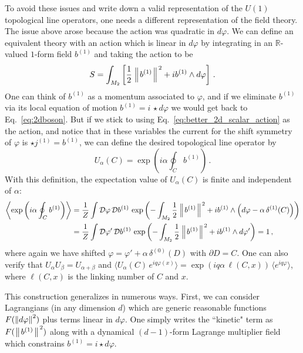 \documentclass[11pt]{article}
\newcommand{\formabs}[1]{\left\Arrowvert #1 \right\Arrowvert}
\begin{document}
To avoid these issues and write down a valid representation of the $U(1)$ topological line operators, one needs a different representation of the field theory.  The issue above arose because the action was quadratic in $d\varphi$.  We can define an equivalent theory with an action which is linear in $d\varphi$ by integrating in an $\mathbb{R}$-valued $1$-form field $b^{(1)}$ and taking the action to be 
\begin{equation}
S =\int_{M_2} \left[ \frac{1}{2}\formabs{b^{(1)}}^2 + i b^{(1)} \wedge d\varphi \right]\,.  
\label{eq:better_2d_scalar_action}
\end{equation}
One can think of $b^{(1)}$ as a momentum associated to $\varphi$, and if we eliminate $b^{(1)}$ via its local equation of motion $b^{(1)} =  i\,\star d\varphi$ we would get back to  Eq.~\eqref{eq:2dboson}. But if we stick to using Eq.~\eqref{eq:better_2d_scalar_action} as the action, and notice that in these variables the current for  the shift symmetry of $\varphi$ is $\star j^{(1)} = b^{(1)}$, we can define the desired topological line operator by
\begin{equation} \label{eq:betterU}
    U_\alpha(C) = \exp{\left(i\alpha\oint_C b^{(1)}\right)}\,.
\end{equation}
With this definition, the expectation value of $U_{\alpha}(C)$ is finite and independent of $\alpha$:
\begin{align}
   \left\langle \exp{\left(i\alpha\oint_C b^{(1)} \right)}\right\rangle &= \frac{1}{Z}\int\mathcal D\varphi \,\mathcal Db^{(1)}\, \exp{\left(-\int_{M_2} \frac{1}{2}\formabs{b^{(1)}}^2 + ib^{(1)}\wedge\left(d\varphi - \alpha \,\delta^{(1)}(C)\right)\right)} \nonumber\\
   &= \frac{1}{Z}\int\mathcal D\varphi' \,\mathcal Db^{(1)}\, \exp{\left(-\int_{M_2} \frac{1}{2}\formabs{b^{(1)}}^2 + ib^{(1)}\wedge d\varphi' \right)}= 1 \,,
\end{align}
where again we have shifted $\varphi = \varphi' + \alpha\, \delta^{(0)}(D)$ with $\partial D = C$. One can also verify that $U_\alpha U_\beta = U_{\alpha+\beta}$ and $
\langle U_\alpha(C) \, e^{iq\varphi(x)}\rangle = \exp\left(iq\alpha\,
\ell(C,x)\right)\,\langle e^{iq\varphi}\rangle$, where $\ell(C,x)$ is the linking number of $C$ and $x$.

This construction generalizes in numerous ways. First, we can consider Lagrangians (in any dimension $d$) which are generic reasonable functions $F(\formabs{d\varphi}^2)$ plus terms linear in $d\varphi$. One simply writes the ``kinetic" term as $F(\formabs{b^{(1)}}^2)$ along with a dynamical $(d-1)$-form Lagrange multiplier field which  constrains $b^{(1)} = i\star d\varphi$.
\end{document}
